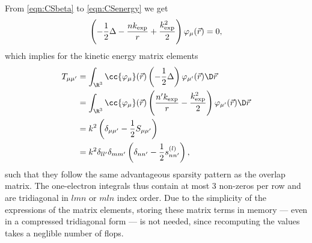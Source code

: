 From \eqref{eqn:CSbeta} to \eqref{eqn:CSenergy} we get
\[ \left(- \frac12 \Delta - \frac{n k_\text{exp}}{r} + \frac{k_\text{exp}^2}{2} \right) \varphi_{\mu}(\vec{r}) = 0, \]
which implies for the kinetic energy matrix elements
\begin{equation}
	\begin{aligned}
		T_{\mu\mu'} &=
		\int_{\R^3} \cc{\varphi_{\mu}}(\vec{r}) \left( - \frac12 \Delta  \right)
		\varphi_{\mu'}(\vec{r})  \D\vec{r} \\
		&= \int_{\R^3} \cc{\varphi_{\mu}}(\vec{r})
		\left(\frac{n' \kexp}{r} - \frac{\kexp^2}{2} \right)
		\varphi_{\mu'}(\vec{r})  \D\vec{r} \\
		&= k^2 \left( \delta_{\mu\mu'} - \frac12 S_{\mu\mu'} \right) \\
		&= k^2 \delta_{ll'} \delta_{mm'} \left( \delta_{nn'} - \frac{1}{2} s^{(l)}_{n n'} \right),
	\end{aligned}
	\label{eqn:KineticCS}
\end{equation}
such that they follow the same advantageous sparsity pattern as the overlap matrix.
The one-electron integrals thus contain at most 3 non-zeros per row
and are tridiagonal in $lmn$ or $mln$ index order.
Due to the simplicity of the expressions of the matrix elements,
storing these matrix terms in memory --- even in a compressed tridiagonal form ---
is not needed,
since recomputing the values takes a neglible number of flops.

